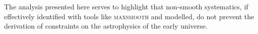 The analysis presented here serves to highlight that non-smooth systematics, if effectively identified with tools like \textsc{maxsmooth} and modelled, do not prevent the derivation of constraints on the astrophysics of the early universe.


